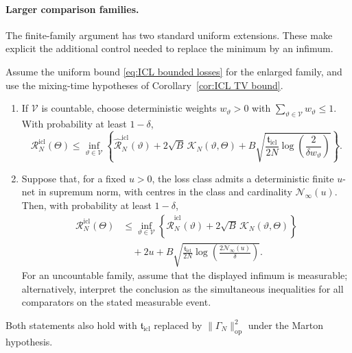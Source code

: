 \paragraph{Larger comparison families.}

The finite-family argument has two standard uniform extensions. These make explicit the additional control needed to replace the minimum by an infimum.

\begin{proposition}
\label{prop:ICL infinite comparators}
Assume the uniform bound \eqref{eq:ICL bounded losses} for the enlarged family, and use the mixing-time hypotheses of Corollary~\ref{cor:ICL TV bound}.
\begin{enumerate}
\item If \(\mathcal V\) is countable, choose deterministic weights \(w_\vartheta>0\) with \(\sum_{\vartheta\in\mathcal V}w_\vartheta\leqslant1\). With probability at least \(1-\delta\),
\[
\mathcal R_N^{\mathrm{icl}}(\Theta)
\leqslant\inf_{\vartheta\in\mathcal V}
\left\{\widehat{\mathcal R}_N^{\mathrm{icl}}(\vartheta)
+2\sqrt B\,\mathcal K_N(\vartheta,\Theta)
+B\sqrt{\frac{\mathfrak t_{\mathrm{icl}}}{2N}
\log\left(\frac{2}{\delta w_\vartheta}\right)}\right\}.
\]
\item Suppose that, for a fixed \(u>0\), the loss class admits a deterministic finite \(u\)-net in supremum norm, with centres in the class and cardinality \(\mathcal N_\infty(u)\). Then, with probability at least \(1-\delta\),
\[
\begin{aligned}
\mathcal R_N^{\mathrm{icl}}(\Theta)
&\leqslant\inf_{\vartheta\in\mathcal V}
\left\{\widehat{\mathcal R}_N^{\mathrm{icl}}(\vartheta)
+2\sqrt B\,\mathcal K_N(\vartheta,\Theta)\right\}\\
&\quad+2u+B\sqrt{\frac{\mathfrak t_{\mathrm{icl}}}{2N}
\log\left(\frac{2\mathcal N_\infty(u)}{\delta}\right)}.
\end{aligned}
\]
For an uncountable family, assume that the displayed infimum is measurable; alternatively, interpret the conclusion as the simultaneous inequalities for all comparators on the stated measurable event.
\end{enumerate}
Both statements also hold with \(\mathfrak t_{\mathrm{icl}}\) replaced by \(\|\Gamma_N\|_{\mathrm{op}}^2\) under the Marton hypothesis.
\end{proposition}

